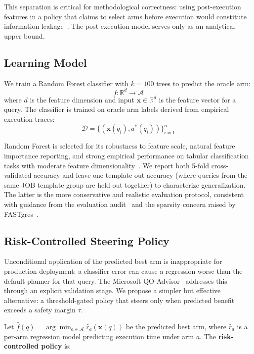 \documentclass[sigconf,natbib=false]{article}
\newcommand{\threshold}{\tau}
\begin{document}
This separation is critical for methodological correctness: using post-execution features in
a policy that claims to select arms before execution would constitute information
leakage~\cite{Lehmann2024}. The post-execution model serves only as an analytical upper bound.

\subsection{Learning Model}

We train a Random Forest classifier with $k=100$ trees to predict the oracle arm:
\[
  f: \mathbb{R}^d \to \mathcal{A}
\]
where $d$ is the feature dimension and input $\mathbf{x} \in \mathbb{R}^d$ is the feature
vector for a query. The classifier is trained on oracle arm labels derived from empirical
execution traces:
\[
  \mathcal{D} = \{(\mathbf{x}(q_i), a^*(q_i))\}_{i=1}^n
\]

Random Forest is selected for its robustness to feature scale, natural feature importance
reporting, and strong empirical performance on tabular classification tasks with moderate
feature dimensionality~\cite{Breiman2001}. We report both 5-fold cross-validated accuracy and
leave-one-template-out accuracy (where queries from the same JOB template group are held out
together) to characterize generalization. The latter is the more conservative and realistic
evaluation protocol, consistent with guidance from the evaluation audit~\cite{Lehmann2024}
and the sparsity concern raised by FASTgres~\cite{Habich2023}.

\subsection{Risk-Controlled Steering Policy}
\label{sec:method:policy}

Unconditional application of the predicted best arm is inappropriate for production
deployment: a classifier error can cause a regression worse than the default planner for that
query. The Microsoft QO-Advisor~\cite{Ding2022} addresses this through an explicit validation
stage. We propose a simpler but effective alternative: a threshold-gated policy that steers
only when predicted benefit exceeds a safety margin $\threshold$.

Let $\hat{f}(q) = \arg\min_{a \in \mathcal{A}} \hat{r}_a(\mathbf{x}(q))$ be the predicted
best arm, where $\hat{r}_a$ is a per-arm regression model predicting execution time under arm
$a$. The \textbf{risk-controlled policy} is:
\end{document}
